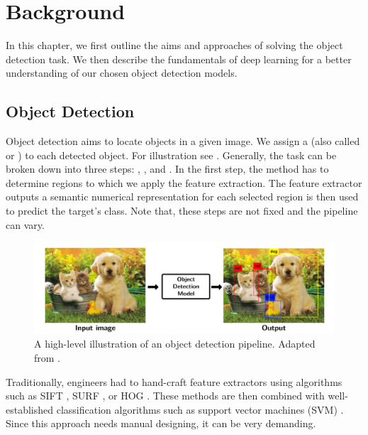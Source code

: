 \chapter{Background}
In this chapter, we first outline the aims and approaches of solving the object
detection task. We then describe the fundamentals of deep learning for a better
understanding of our chosen object detection models.

\section{Object Detection}
Object detection aims to locate objects in a given image. We assign a
 (also called  or ) to each detected object.
For illustration see . Generally, the task can be broken
down into three steps: ,
, and . In the first step, the
method has to determine regions to which we apply the feature extraction. The
feature extractor outputs a semantic numerical representation for each selected
region is then used to predict the target's class. Note that, these steps are
not fixed and the pipeline can vary.

\begin{figure}[h]
    \centering
    \includegraphics[width=0.9\linewidth]{Sources/Figures/objectdetection.png}
    \caption{A high-level illustration of an object detection pipeline. Adapted
        from \cite{objectdetectionfigure}.}
    \label{fig:od}
\end{figure}

Traditionally, engineers had to hand-craft feature extractors using algorithms
such as SIFT \cite{sift}, SURF \cite{surf}, or HOG \cite{hog}. These methods are
then combined with well-established classification algorithms such as support
vector machines (SVM) \cite{svm}. Since this approach needs manual designing, it
can be very demanding.

